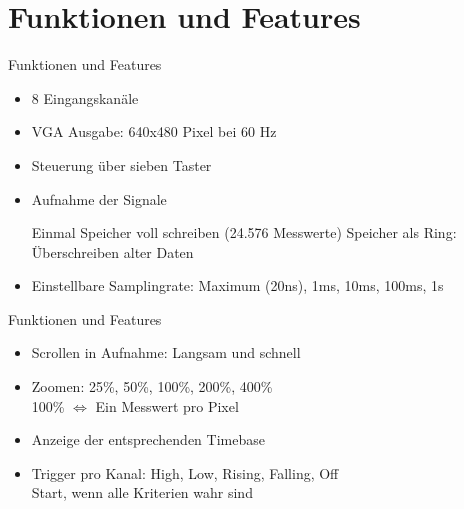 \section{Funktionen und Features}
\begin{frame}[<+->]{Funktionen und Features}
    \begin{itemize}
        \item 8 Eingangskanäle
        \item VGA Ausgabe: 640x480 Pixel bei 60 Hz
        \item Steuerung über sieben Taster
        \item Aufnahme der Signale
            \begin{itemize}
                \smallitem Einmal Speicher voll schreiben (24.576 Messwerte)
                \smallitem Speicher als Ring: Überschreiben alter Daten
            \end{itemize}
        \item Einstellbare Samplingrate: Maximum (20ns), 1ms, 10ms, 100ms, 1s
    \end{itemize}
\end{frame}
\begin{frame}[<+->]{Funktionen und Features}
    \begin{itemize}
        \item Scrollen in Aufnahme: Langsam und schnell
        \item Zoomen: 25\%, 50\%, 100\%, 200\%, 400\% \\
            100\% $\Leftrightarrow$ Ein Messwert pro Pixel
        \item Anzeige der entsprechenden Timebase
        \item Trigger pro Kanal: High, Low, Rising, Falling, Off \\
            Start, wenn alle Kriterien wahr sind
    \end{itemize}
\end{frame}
